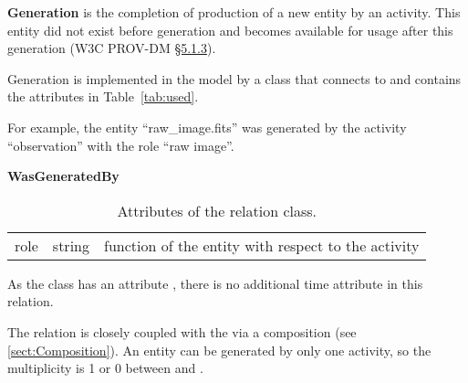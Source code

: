 \textbf{Generation} is the completion of production of a new entity by an activity. This entity did not exist before generation and becomes available for usage after this generation (W3C PROV-DM \href{https://www.w3.org/TR/prov-dm/#term-Generation}{\S5.1.3}).
        
Generation is implemented in the model by a class  that connects  to  and contains the attributes in Table~\ref{tab:used}.

For example, the entity ``raw\_image.fits'' was generated by the activity ``observation'' with the role ``raw image''.

\begin{table}[ht]
\small
{}\textwidth
\textbf{\normalsize WasGeneratedBy}\vspace{0.25em}\\
\begin{tabulary}{1.0\textwidth}{llL}
\toprule
{} &  & \\
\midrule
role   &  string   &  function of the entity with respect to the activity\\
\bottomrule
\end{tabulary}
\caption[Attributes of the  relation class]{Attributes of the  relation class.}
\label{tab:wasgeneratedby}
\end{table}

As the  class has an attribute , there is no additional time attribute in this relation.

The  relation is closely coupled with the  via a composition (see \ref{sect:Composition}). 
An entity can be generated by only one activity, so the multiplicity is 1 or 0 between  and .


